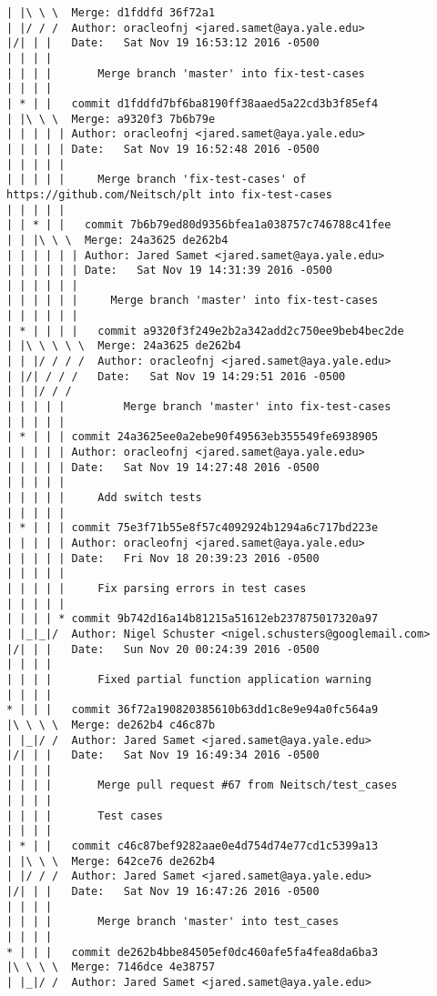\begin{lstlisting}
| |\ \ \  Merge: d1fddfd 36f72a1
| |/ / /  Author: oracleofnj <jared.samet@aya.yale.edu>
|/| | |   Date:   Sat Nov 19 16:53:12 2016 -0500
| | | |   
| | | |       Merge branch 'master' into fix-test-cases
| | | |       
| * | |   commit d1fddfd7bf6ba8190ff38aaed5a22cd3b3f85ef4
| |\ \ \  Merge: a9320f3 7b6b79e
| | | | | Author: oracleofnj <jared.samet@aya.yale.edu>
| | | | | Date:   Sat Nov 19 16:52:48 2016 -0500
| | | | | 
| | | | |     Merge branch 'fix-test-cases' of https://github.com/Neitsch/plt into fix-test-cases
| | | | |        
| | * | |   commit 7b6b79ed80d9356bfea1a038757c746788c41fee
| | |\ \ \  Merge: 24a3625 de262b4
| | | | | | Author: Jared Samet <jared.samet@aya.yale.edu>
| | | | | | Date:   Sat Nov 19 14:31:39 2016 -0500
| | | | | | 
| | | | | |     Merge branch 'master' into fix-test-cases
| | | | | |         
| * | | | |   commit a9320f3f249e2b2a342add2c750ee9beb4bec2de
| |\ \ \ \ \  Merge: 24a3625 de262b4
| | |/ / / /  Author: oracleofnj <jared.samet@aya.yale.edu>
| |/| / / /   Date:   Sat Nov 19 14:29:51 2016 -0500
| | |/ / /    
| | | | |         Merge branch 'master' into fix-test-cases
| | | | |      
| * | | | commit 24a3625ee0a2ebe90f49563eb355549fe6938905
| | | | | Author: oracleofnj <jared.samet@aya.yale.edu>
| | | | | Date:   Sat Nov 19 14:27:48 2016 -0500
| | | | | 
| | | | |     Add switch tests
| | | | |      
| * | | | commit 75e3f71b55e8f57c4092924b1294a6c717bd223e
| | | | | Author: oracleofnj <jared.samet@aya.yale.edu>
| | | | | Date:   Fri Nov 18 20:39:23 2016 -0500
| | | | | 
| | | | |     Fix parsing errors in test cases
| | | | |      
| | | | * commit 9b742d16a14b81215a51612eb237875017320a97
| |_|_|/  Author: Nigel Schuster <nigel.schusters@googlemail.com>
|/| | |   Date:   Sun Nov 20 00:24:39 2016 -0500
| | | |   
| | | |       Fixed partial function application warning
| | | |       
* | | |   commit 36f72a190820385610b63dd1c8e9e94a0fc564a9
|\ \ \ \  Merge: de262b4 c46c87b
| |_|/ /  Author: Jared Samet <jared.samet@aya.yale.edu>
|/| | |   Date:   Sat Nov 19 16:49:34 2016 -0500
| | | |   
| | | |       Merge pull request #67 from Neitsch/test_cases
| | | |       
| | | |       Test cases
| | | |       
| * | |   commit c46c87bef9282aae0e4d754d74e77cd1c5399a13
| |\ \ \  Merge: 642ce76 de262b4
| |/ / /  Author: Jared Samet <jared.samet@aya.yale.edu>
|/| | |   Date:   Sat Nov 19 16:47:26 2016 -0500
| | | |   
| | | |       Merge branch 'master' into test_cases
| | | |       
* | | |   commit de262b4bbe84505ef0dc460afe5fa4fea8da6ba3
|\ \ \ \  Merge: 7146dce 4e38757
| |_|/ /  Author: Jared Samet <jared.samet@aya.yale.edu>

\end{lstlisting}
